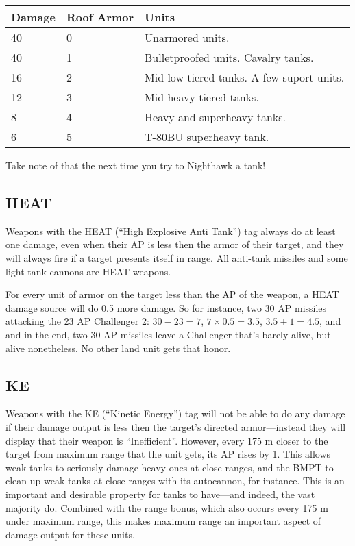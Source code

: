 \documentclass{article}
\begin{document}
\begin{center}
    \begin{tabular}{ | l | l | l | }
    \hline
    Damage & Roof Armor & Units \\ \hline
    40 & 0 & Unarmored units.\\
    40 & 1 & Bulletproofed units. Cavalry tanks.\\
    16  & 2 & Mid-low tiered tanks. A few suport units.\\
    12  & 3 & Mid-heavy tiered tanks.\\
    8  & 4 & Heavy and superheavy tanks.\\
    6  & 5 & T-80BU superheavy tank.\\
    \hline
    \end{tabular}
\end{center}

Take note of that the next time you try to Nighthawk a tank!

\subsection{HEAT}

Weapons with the HEAT (``High Explosive Anti Tank'') tag always do at least one
damage, even when their AP is less then the armor of their target, and they will
always fire if a target presents itself in range. All anti-tank missiles and
some light tank cannons are HEAT weapons.

For every unit of armor on the target less than the AP of the weapon, a HEAT
damage source will do 0.5 more damage. So for instance, two 30 AP missiles
attacking the 23 AP Challenger 2: $30-23=7$, $7\times 0.5=3.5$, $3.5 + 1 = 4.5$,
and and in the end, two 30-AP missiles leave a Challenger that's barely alive,
but alive nonetheless. No other land unit gets that honor.

\subsection{KE}

Weapons with the KE (``Kinetic Energy'') tag will not be able to do any damage
if their damage output is less then the target's directed armor---instead they
will display that their weapon is ``Inefficient''. However, every 175 m closer
to the target from maximum range that the unit gets, its AP rises by 1. This
allows weak tanks to seriously damage heavy ones at close ranges, and the BMPT
to clean up weak tanks at close ranges with its autocannon, for instance. This
is an important and desirable property for tanks to have---and indeed, the vast
majority do. Combined with the range bonus, which also occurs every 175 m under
maximum range, this makes maximum range an important aspect of damage output for
these units.
\end{document}
